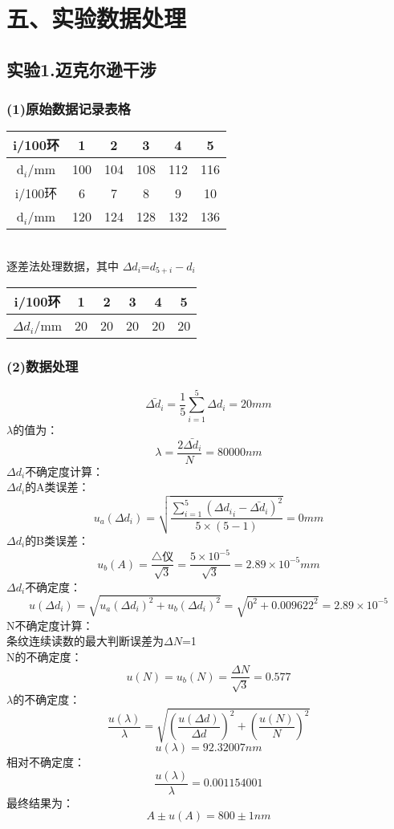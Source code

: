 \documentclass[11pt,a4paper,oneside]{article}
\begin{document}
\section*{五、实验数据处理}
\subsection*{实验1.迈克尔逊干涉}
\subsubsection*{(1)原始数据记录表格}

\begin{center}

\begin{tabular}{|c|c|c|c|c|c|}
\hline
i/100环 & 1 & 2 & 3 & 4 & 5 \\
\hline
d$_i$/mm
&100&104&108&112&116
\\
\hline
i/100环 & 6 & 7 & 8 & 9 & 10 \\
\hline
d$_i$/mm
&120&124&128&132&136
\\
\hline
\end{tabular}
\\
\vspace{10pt}
逐差法处理数据，其中 ${\Delta}d_i$=$d_{5+i}-d_i$
\begin{tabular}{|c|c|c|c|c|c|}
\hline
i/100环 & 1 & 2 & 3 & 4 & 5 \\
\hline
${\Delta}d_i$/mm
&20&20&20&20&20
\\
\hline
\end{tabular}
\vspace{10pt}

\end{center}

\subsubsection*{(2)数据处理}

$$\bar{{\Delta}d_i} =\frac{1}{5}\sum\limits_{i=1}^{5}{{\Delta}d_i}=20 mm$$
$\lambda$的值为：$$\lambda=\frac{2\bar{{\Delta}d_i}}{N}=80000 nm$$
${\Delta}d_i$不确定度计算：\\
${\Delta}d_i$的A类误差：$$u_a({{\Delta}d_i})=\sqrt{\displaystyle\frac{\sum\limits_{i=1}^{5} ({{\Delta}d_i}_i-\bar{{\Delta}d_i})^2}{5{\times}(5-1)}}=0 mm$$
${\Delta}d_i$的B类误差：$$u_b({A})=\displaystyle\frac{\bigtriangleup\text{仪}}{\sqrt{3}}
= \frac{5 \times 10^{-5}}{\sqrt{3}} =  2.89 \times 10^{-5} mm$$
${{\Delta}d_i}$不确定度：$$u({{\Delta}d_i})=\sqrt{{u_a({{\Delta}d_i})}^2+{u_b({{\Delta}d_i})}^2}=\sqrt{ 0^2 + 0.009622^2} = 2.89{\times}10^{-5} $$
N不确定度计算：\\
条纹连续读数的最大判断误差为${\Delta}N$=1\\
N的不确定度：$$u(N)=u_b(N)=\frac{{\Delta}N}{\sqrt{3}}=0.577$$
$\lambda$的不确定度：$$\frac{u(\lambda)}{\lambda}=\sqrt{(\frac{u({\Delta}d)}{{\Delta}d})^2+(\frac{u(N)}{N})^2}$$
$$ u(\lambda) = 92.32007 nm$$
相对不确定度：$$\displaystyle\frac{u(\lambda)}{\lambda}=0.001154001$$
最终结果为：$$A{\pm}u(A) = 800 {\pm} 1 nm$$
\end{document}
